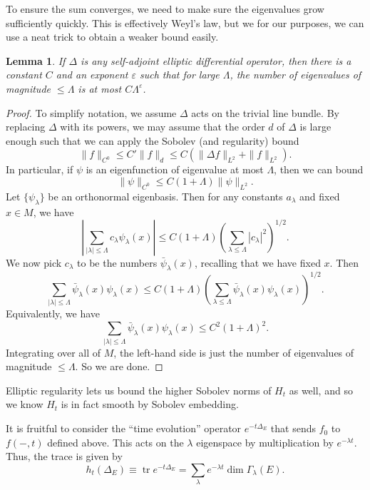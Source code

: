 \documentclass{shortart}
\newtheorem{lemma}[thm]{Lemma}
\theoremstyle{definition}
\DeclareMathOperator\tr{tr}
\begin{document}
To ensure the sum converges, we need to make sure the eigenvalues grow sufficiently quickly. This is effectively Weyl's law, but we for our purposes, we can use a neat trick to obtain a weaker bound easily.
\begin{lemma}\label{lemma:weyl-law}
  If $\Delta$ is any self-adjoint elliptic differential operator, then there is a constant $C$ and an exponent $\varepsilon$ such that for large $\Lambda$, the number of eigenvalues of magnitude $\leq \Lambda$ is at most $C \Lambda^\varepsilon$.
\end{lemma}

\begin{proof}
  To simplify notation, we assume $\Delta$ acts on the trivial line bundle. By replacing $\Delta$ with its powers, we may assume that the order $d$ of $\Delta$ is large enough such that we can apply the Sobolev (and regularity) bound
  \[
    \|f\|_{C^0} \leq C' \|f\|_d \leq C (\|\Delta f\|_{L^2} + \|f\|_{L^2}).
  \]
  In particular, if $\psi$ is an eigenfunction of eigenvalue at most $\Lambda$, then we can bound
  \[
    \|\psi\|_{C^0} \leq C(1 + \Lambda) \|\psi\|_{L^2}.
  \]
  Let $\{\psi_\lambda\}$ be an orthonormal eigenbasis. Then for any constants $a_\lambda$ and fixed $x \in M$, we have
  \[
    \left|\sum_{|\lambda| \leq \Lambda} c_\lambda \psi_\lambda(x) \right| \leq C(1 + \Lambda) \left(\sum_{\lambda \leq \Lambda} |c_\lambda|^2\right)^{1/2}.
  \]
  We now pick $c_\lambda$ to be the numbers $\bar{\psi}_\lambda(x)$, recalling that we have fixed $x$. Then
  \[
    \sum_{|\lambda| \leq \Lambda} \bar{\psi}_\lambda (x) \psi_\lambda(x) \leq C(1 + \Lambda) \left(\sum_{\lambda \leq \Lambda} \bar{\psi}_\lambda(x) \psi_\lambda(x)\right)^{1/2}.
  \]
  Equivalently, we have
  \[
    \sum_{|\lambda| \leq \Lambda} \bar{\psi}_\lambda(x) \psi_\lambda(x) \leq C^2(1 + \Lambda)^2.
  \]
  Integrating over all of $M$, the left-hand side is just the number of eigenvalues of magnitude $\leq \Lambda$. So we are done.
\end{proof}

Elliptic regularity lets us bound the higher Sobolev norms of $H_t$ as well, and so we know $H_t$ is in fact smooth by Sobolev embedding.

It is fruitful to consider the ``time evolution'' operator $e^{-t \Delta_E}$ that sends $f_0$ to $f(-, t)$ defined above. This acts on the $\lambda$ eigenspace by multiplication by $e^{-\lambda t}$. Thus, the trace is given by
\[
  h_t(\Delta_E) \equiv \tr e^{-t \Delta_E} = \sum_\lambda e^{-\lambda t} \dim \Gamma_\lambda(E).
\]
\end{document}
